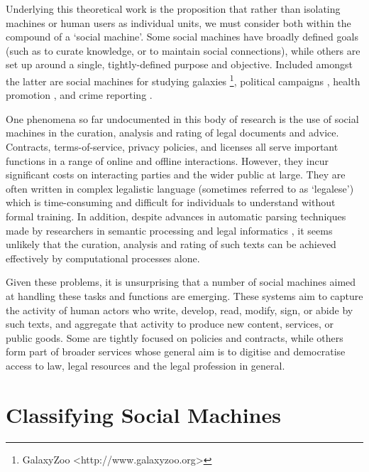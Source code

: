 \documentclass{sig-alternate}
\begin{document}
Underlying this theoretical work is the proposition that rather than isolating machines or human users as individual units, we must consider both within the compound of a `social machine'. Some social machines have broadly defined goals (such as to curate knowledge, or to maintain social connections), while others are set up around a single, tightly-defined purpose and objective. Included amongst the latter are social machines for studying galaxies \footnote{GalaxyZoo <http://www.galaxyzoo.org>}, political campaigns \cite{ohara:politics}, health promotion \cite{kleek:health}, and crime reporting \cite{evans:crime}.

One phenomena so far undocumented in this body of research is the use of social machines in the curation, analysis and rating of legal documents and advice. Contracts, terms-of-service, privacy policies, and licenses all serve important functions in a range of online and offline interactions. However, they incur significant costs on interacting parties and the wider public at large. They are often written in complex legalistic language (sometimes referred to as `legalese') which is time-consuming and difficult for individuals to understand without formal training. In addition, despite advances in automatic parsing techniques made by researchers in semantic processing and legal informatics \cite{franc:semantic, spinosa:nlp}, it seems unlikely that the curation, analysis and rating of such texts can be achieved effectively by computational processes alone.

Given these problems, it is unsurprising that a number of social machines aimed at handling these tasks and functions are emerging. These systems aim to capture the activity of human actors who write, develop, read, modify, sign, or abide by such texts, and aggregate that activity to produce new content, services, or public goods. Some are tightly focused on policies and contracts, while others form part of broader services whose general aim is to digitise and democratise access to law, legal resources and the legal profession in general.

\section{Classifying Social Machines}
\end{document}
